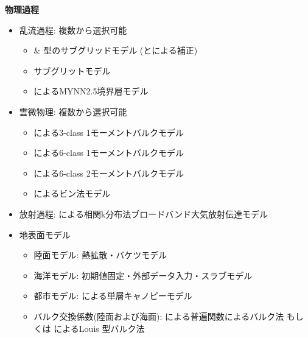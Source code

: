 {\bf 物理過程}
\begin{itemize}
 \item 乱流過程: 複数から選択可能
   \begin{itemize}
    \item \citet{smagorinsky_1963} \& \citet{lilly_1962}型のサブグリッドモデル (\citet{Brown_etal_1994}と\citet{Scotti_1993}による補正)
    \item \citet{Deardorff_1980} サブグリットモデル
    \item \citet{my_1982,nakanishi_2004}によるMYNN2.5境界層モデル
   \end{itemize}
 \item 雲微物理: 複数から選択可能
   \begin{itemize}
    \item \citet{kessler_1969}による3-class 1モーメントバルクモデル
    \item \citet{tomita_2008}による6-class 1モーメントバルクモデル
    \item \citet{sn_2014}による6-class 2モーメントバルクモデル
    \item \citet{suzuki_etal_2010}によるビン法モデル
   \end{itemize}
 \item 放射過程: \citet{sekiguchi_2008}による相関k分布法ブロードバンド大気放射伝達モデル
 \item 地表面モデル
  \begin{itemize}
   \item 陸面モデル: 熱拡散・バケツモデル
   \item 海洋モデル: 初期値固定・外部データ入力・スラブモデル
   \item 都市モデル: \citet{kusaka_2001}による単層キャノピーモデル
   \item バルク交換係数(陸面および海面): \citet{beljaars_1991,wilson_2001}による普遍関数によるバルク法
     もしくは \citet{uno_1995}によるLouis 型バルク法
  \end{itemize}
\end{itemize}

